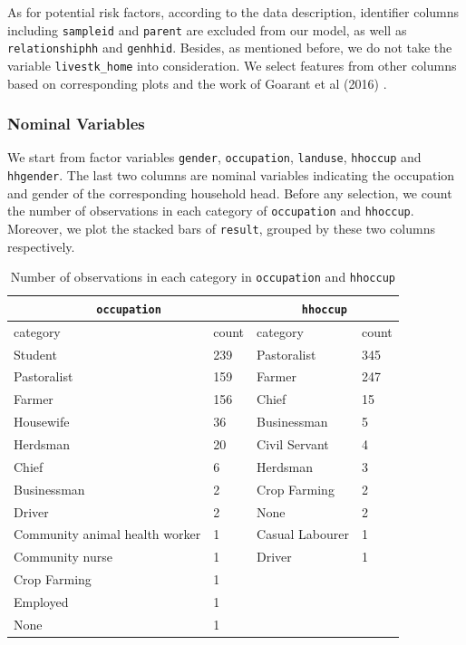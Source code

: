 \documentclass[11pt,twoside]{article}
\numberwithin{Theorem}{section}
\numberwithin{Definition}{section}
\numberwithin{Lemma}{section}
\numberwithin{Algorithm}{section}
\numberwithin{equation}{section}
\begin{document}
As for potential risk factors, according to the data description, identifier columns including \texttt{sampleid} and \texttt{parent} are excluded from our model, as well as \texttt{relationshiphh} and \texttt{genhhid}. Besides, as mentioned before, we do not take the variable \texttt{livestk\_home} into consideration. We select features from other columns based on corresponding plots and the work of Goarant et al (2016) \cite{goarant2016}. 

\subsubsection{Nominal Variables}

We start from factor variables \texttt{gender}, \texttt{occupation}, \texttt{landuse}, \texttt{hhoccup} and \texttt{hhgender}. The last two columns are nominal variables indicating the occupation and gender of the corresponding household head. Before any selection, we count the number of observations in each category of \texttt{occupation} and \texttt{hhoccup}. Moreover, we plot the stacked bars of \texttt{result}, grouped by these two columns respectively.

\begin{table}[!h]
	\centering
	\begin{tabular}{|l|l|l|l|}
		\hline
		\multicolumn{2}{|c|}{\texttt{occupation}} & \multicolumn{2}{|c|}{\texttt{hhoccup}} \\
		\hline
		category & 	count & category & count \\
		\hline
		Student & 239 & Pastoralist & 345 \\				
		Pastoralist & 159 & Farmer & 247 \\
		Farmer & 156 & Chief & 15 \\
		Housewife & 36	& Businessman & 5 \\			
		Herdsman & 20 & Civil Servant & 4 \\	
		Chief & 6 & Herdsman & 3 \\	
		Businessman & 2 & Crop Farming & 2 \\
		Driver & 2 & None & 2 \\
		Community animal health worker & 1 & Casual Labourer & 1 \\			
		Community nurse & 1	& Driver & 1 \\	
		Crop Farming & 1 & & \\			
		Employed & 1 & & \\
		None & 1 & & \\
		\hline
	\end{tabular}	
	\caption{Number of observations in each category in \texttt{occupation} and \texttt{hhoccup}}
	\label{tab:occ}
\end{table}
\end{document}
